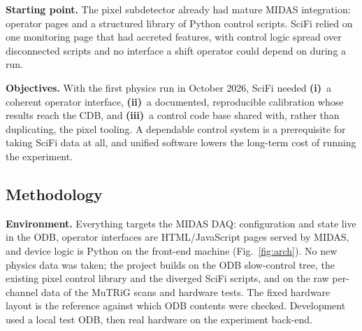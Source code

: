 \documentclass[10.5pt,a4paper]{article}
\newcommand{\pill}[1]{{\sffamily\bfseries\small\color{navy}#1}\;}
\begin{document}
\pill{Starting point.}
The pixel subdetector already had mature MIDAS integration: operator pages and
a structured library of Python control scripts. SciFi relied on one monitoring
page that had accreted features, with control logic spread over disconnected
scripts and no interface a shift operator could depend on during a run.

\pill{Objectives.}
With the first physics run in October 2026, SciFi needed
\textbf{(i)}~a coherent operator interface,
\textbf{(ii)}~a documented, reproducible calibration whose results reach the CDB,
and \textbf{(iii)}~a control code base shared with, rather than duplicating, the
pixel tooling. A dependable control system is a prerequisite for taking SciFi
data at all, and unified software lowers the long-term cost of running the
experiment.

\subsection{Methodology}

\pill{Environment.}
Everything targets the MIDAS DAQ: configuration and state live in the ODB,
operator interfaces are HTML/JavaScript pages served by MIDAS, and device logic
is Python on the front-end machine (Fig.~\ref{fig:arch}). No new physics data
was taken; the project builds on the ODB slow-control tree, the existing pixel
control library and the diverged SciFi scripts, and on the raw per-channel data
of the MuTRiG scans and hardware tests. The fixed hardware layout is the
reference against which ODB contents were checked. Development used a local
test ODB, then real hardware on the experiment back-end.
\end{document}
